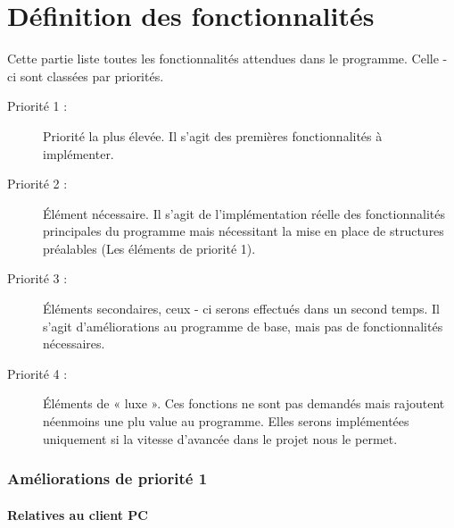 \part{Définition des fonctionnalités}
Cette partie liste toutes les fonctionnalités attendues dans le programme. Celle - ci sont classées par priorités.

\begin{description}
\item [Priorité 1 :]
	Priorité la plus élevée. Il s'agit des premières fonctionnalités à implémenter.

\item [Priorité 2 :]
	Élément nécessaire. Il s'agit de l'implémentation réelle des fonctionnalités principales du programme mais nécessitant la mise en place de structures préalables (Les éléments de priorité 1). 

\item [Priorité 3 :]
	Éléments secondaires, ceux - ci serons effectués dans un second temps. Il s'agit d'améliorations au programme de base, mais pas de fonctionnalités nécessaires.  

\item [Priorité 4 :]
	Éléments de « luxe ». Ces fonctions ne sont pas demandés mais rajoutent néenmoins une plu value au programme. Elles serons implémentées uniquement si la vitesse d'avancée dans le projet nous le permet.
\end{description}


\section{Améliorations de priorité 1}


\subsection{Relatives au client PC}

